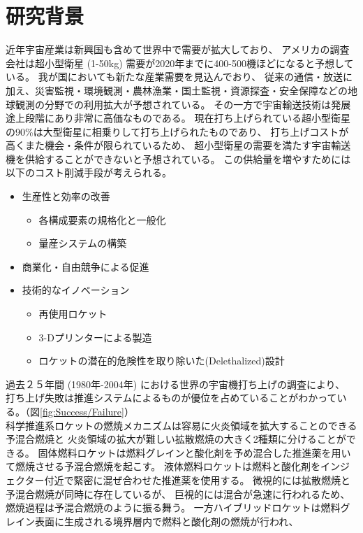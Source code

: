 \section{研究背景}
%
%
近年宇宙産業は新興国も含めて世界中で需要が拡大しており、
アメリカの調査会社は超小型衛星 (1-50kg) 需要が2020年までに400-500機ほどになると予想している。\cite{nano/micro}
我が国においても新たな産業需要を見込んでおり、
従来の通信・放送に加え、災害監視・環境観測・農林漁業・国土監視・資源探査・安全保障などの地球観測の分野での利用拡大が予想されている。
その一方で宇宙輸送技術は発展途上段階にあり非常に高価なものである。
現在打ち上げられている超小型衛星の90\%は大型衛星に相乗りして打ち上げられたものであり、
打ち上げコストが高くまた機会・条件が限られているため、
超小型衛星の需要を満たす宇宙輸送機を供給することができないと予想されている。
この供給量を増やすためには以下のコスト削減手段が考えられる。
\begin{itemize}
	\item 生産性と効率の改善
	\begin{itemize}
		\item 各構成要素の規格化と一般化
		\item 量産システムの構築
	\end{itemize}
	\item 商業化・自由競争による促進
	\item 技術的なイノベーション
	\begin{itemize}
		\item 再使用ロケット
		\item 3-Dプリンターによる製造
		\item ロケットの潜在的危険性を取り除いた(Delethalized)設計 
	\end{itemize}
\end{itemize}
過去２５年間 (1980年-2004年) における世界の宇宙機打ち上げの調査により、
打ち上げ失敗は推進システムによるものが優位を占めていることがわかっている。（図\ref{fig:Success/Failure}）\cite{failure}
\\
科学推進系ロケットの燃焼メカニズムは容易に火炎領域を拡大することのできる予混合燃焼と
火炎領域の拡大が難しい拡散燃焼の大きく2種類に分けることができる。
固体燃料ロケットは燃料グレインと酸化剤を予め混合した推進薬を用いて燃焼させる予混合燃焼を起こす。
液体燃料ロケットは燃料と酸化剤をインジェクター付近で緊密に混ぜ合わせた推進薬を使用する。
微視的には拡散燃焼と予混合燃焼が同時に存在しているが、
巨視的には混合が急速に行われるため、燃焼過程は予混合燃焼のように振る舞う。
一方ハイブリッドロケットは燃料グレイン表面に生成される境界層内で燃料と酸化剤の燃焼が行われ、
